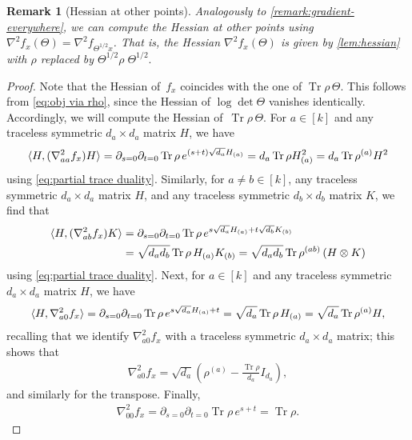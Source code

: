 \documentclass[aos]{imsart}
\newtheorem{remark}[theorem]{Remark}
\theoremstyle{definition}
\numberwithin{equation}{section}
\DeclareMathOperator{\tr}{Tr}
\newcommand{\R}{{\mathbb{R}}}
\renewcommand{\H}{{\mathbb{H}}}
\newcommand{\ot}{\otimes}
\begin{document}
\begin{remark}[Hessian at other points]\label{remark:hessian-everywhere}
Analogously to \cref{remark:gradient-everywhere}, we can compute the Hessian at other points using $\nabla^2 f_{x}(\Theta) = \nabla^2 f_{\Theta^{1/2} x}$. That is, the Hessian $\nabla^2 f_{x}(\Theta)$ is given by \cref{lem:hessian} with $\rho$ replaced by $\Theta^{1/2}\rho\; \Theta^{1/2}.$
\end{remark}
\begin{proof}
  Note that the Hessian of~$f_x$ coincides with the one of $\tr\rho\,\Theta$.
  This follows from \cref{eq:obj via rho}, since the Hessian of $\log\det\Theta$ vanishes identically.
  Accordingly, we will compute the Hessian of~$\tr\rho\,\Theta$.
  For $a\in[k]$ and any traceless symmetric $d_a\times d_a$ matrix $H$, we have
  \begin{align*}
    \braket{H, (\nabla^2_{aa} f_x) H}
  = \partial_{s=0} \partial_{t=0} \tr \rho \, e^{(s+t) \sqrt{d_a} H_{(a)}}
  = d_a \tr \rho H_{(a)}^2
  = d_a \tr \rho^{(a)} H^2
  \end{align*}
  using \cref{eq:partial trace duality}.
  Similarly, for $a\neq b\in[k]$, any traceless symmetric $d_a\times d_a$ matrix $H$, and any traceless symmetric $d_b\times d_b$ matrix $K$, we find that
  \begin{align*}
    \braket{H, (\nabla^2_{ab} f_x) K}
  &= \partial_{s=0} \partial_{t=0} \tr \rho \, e^{s \sqrt{d_a} H_{(a)} + t \sqrt{d_b} K_{(b)}} \\
  &= \sqrt{d_a d_b} \tr \rho \, H_{(a)} K_{(b)}
  = \sqrt{d_a d_b} \tr \rho^{(ab)} \left( H \ot K \right)
  \end{align*}
  using \cref{eq:partial trace duality}.
  Next, for $a\in[k]$ and any traceless symmetric $d_a\times d_a$ matrix $H$, we have
  \begin{align*}
    \braket{H, \nabla^2_{a0} f_x}
  = \partial_{s=0} \partial_{t=0} \tr \rho \, e^{s\sqrt{d_a} H_{(a)} + t}
  = \sqrt{d_a} \tr \rho \, H_{(a)}
  = \sqrt{d_a} \tr \rho^{(a)} H,
  \end{align*}
  recalling that we identify $\nabla^2_{a0} f_x$ with a traceless symmetric $d_a\times d_a$ matrix;
  this shows that
  \begin{align*}
    \nabla^2_{a0} f_x = \sqrt{d_a} \left( \rho^{(a)} - \frac{\tr \rho}{d_a} I_{d_a} \right),
  \end{align*}
  and similarly for the transpose.
  Finally,
  \begin{align*}
    \nabla^2_{00} f_x
  = \partial_{s=0} \partial_{t=0} \tr \rho \, e^{s+t}
  = \tr \rho.
  \end{align*}
\end{proof}
\end{document}
